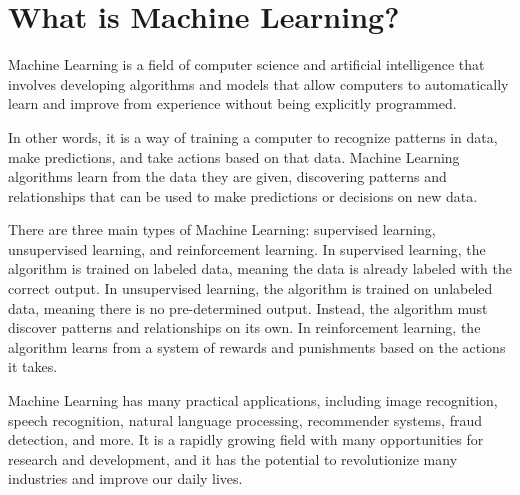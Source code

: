 \section{What is Machine Learning?}
Machine Learning is a field of computer science and artificial intelligence that involves developing algorithms and models that allow computers to automatically learn and improve from experience without being explicitly programmed.

In other words, it is a way of training a computer to recognize patterns in data, make predictions, and take actions based on that data. Machine Learning algorithms learn from the data they are given, discovering patterns and relationships that can be used to make predictions or decisions on new data.

There are three main types of Machine Learning: supervised learning, unsupervised learning, and reinforcement learning. In supervised learning, the algorithm is trained on labeled data, meaning the data is already labeled with the correct output. In unsupervised learning, the algorithm is trained on unlabeled data, meaning there is no pre-determined output. Instead, the algorithm must discover patterns and relationships on its own. In reinforcement learning, the algorithm learns from a system of rewards and punishments based on the actions it takes.

Machine Learning has many practical applications, including image recognition, speech recognition, natural language processing, recommender systems, fraud detection, and more. It is a rapidly growing field with many opportunities for research and development, and it has the potential to revolutionize many industries and improve our daily lives.

